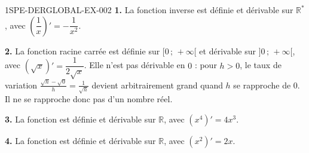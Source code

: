 \begin{corrige}{1SPE-DERGLOBAL-EX-002}
\textbf{1.} La fonction inverse est définie et dérivable sur $\mathbb{R}^*$, avec $\left(\dfrac{1}{x}\right)' = -\dfrac{1}{x^2}$.

\textbf{2.} La fonction racine carrée est définie sur $[0\,;\,+\infty[$ et dérivable sur $]0\,;\,+\infty[$, avec $(\sqrt{x})' = \dfrac{1}{2\sqrt{x}}$.
Elle n'est pas dérivable en $0$ : pour $h>0$, le taux de variation
$\frac{\sqrt{h}-\sqrt{0}}{h}=\frac{1}{\sqrt{h}}$ devient arbitrairement grand
quand $h$ se rapproche de $0$. Il ne se rapproche donc pas d'un nombre réel.

\textbf{3.} La fonction est définie et dérivable sur $\mathbb{R}$, avec $(x^4)' = 4x^3$.

\textbf{4.} La fonction est définie et dérivable sur $\mathbb{R}$, avec $(x^2)' = 2x$.
\end{corrige}
